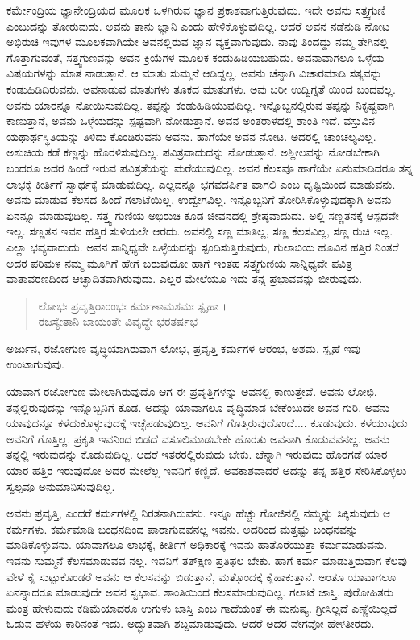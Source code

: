 ಕರ್ಮೇಂದ್ರಿಯ ಜ್ಞಾನೇಂದ್ರಿಯದ ಮೂಲಕ ಒಳಗಿರುವ ಜ್ಞಾನ ಪ್ರಕಾಶವಾಗುತ್ತಿರುವುದು. ಇದೇ ಅವನು ಸತ್ತ್ವಗುಣಿ ಎಂಬುದನ್ನು ತೋರುವುದು. ಅವನು ತಾನು ಜ್ಞಾನಿ ಎಂದು ಹೇಳಿಕೊಳ್ಳುವುದಿಲ್ಲ. ಆದರೆ ಅವನ ನಡೆನುಡಿ ನೋಟ ಅಭಿರುಚಿ ಇವುಗಳ ಮೂಲಕವಾಗಿಯೇ ಅವನಲ್ಲಿರುವ ಜ್ಞಾನ ವ್ಯಕ್ತವಾಗುವುದು. ನಾವು ತಿಂದದ್ದು ನಮ್ಮ ತೇಗಿನಲ್ಲಿ ಗೊತ್ತಾಗುವಂತೆ, ಸತ್ತ್ವಗುಣವನ್ನು ಅವನ ಕ್ರಿಯೆಗಳ ಮೂಲಕ ಕಂಡುಹಿಡಿಯಬಹುದು. ಅವನಾವಾಗಲೂ ಒಳ್ಳೆಯ ವಿಷಯಗಳನ್ನು ಮಾತ ನಾಡುತ್ತಾನೆ. ಆ ಮಾತು ಸುಮ್ಮನೆ ಆಡಿದ್ದಲ್ಲ. ಅವನು ಚೆನ್ನಾಗಿ ವಿಚಾರಮಾಡಿ ಸತ್ಯವನ್ನು ಕಂಡುಹಿಡಿದಿರುವನು. ಅವನಾಡುವ ಮಾತುಗಳು ತೂಕದ ಮಾತುಗಳು. ಅವು ಬರೀ ಉದ್ವಿಗ್ನತೆ ಯಿಂದ ಬಂದವಲ್ಲ. ಅವನು ಯಾರನ್ನೂ ನೋಯಿಸುವುದಿಲ್ಲ. ತಪ್ಪನ್ನು ಕಂಡುಹಿಡಿಯುವುದಿಲ್ಲ. ಇನ್ನೊಬ್ಬನಲ್ಲಿರುವ ತಪ್ಪನ್ನು ನಿಕೃಷ್ಚವಾಗಿ ಕಾಣುತ್ತಾನೆ, ಅವನು ಒಳ್ಳೆಯದನ್ನು ಸ್ಪಷ್ಟವಾಗಿ ನೋಡುತ್ತಾನೆ. ಅವನ ಅಂತರಾಳದಲ್ಲಿ ಶಾಂತಿ ಇದೆ. ವಸ್ತುವಿನ ಯಥಾರ್ಥಸ್ಥಿತಿಯನ್ನು ತಿಳಿದು ಕೊಂಡಿರುವನು ಅವನು. ಹಾಗೆಯೇ ಅವನ ನೋಟ. ಅದರಲ್ಲಿ ಚಾಂಚಲ್ಯವಿಲ್ಲ. ಅಶುಚಿಯ ಕಡೆ ಕಣ್ಣನ್ನು ಹೊರಳಿಸುವುದಿಲ್ಲ. ಪವಿತ್ರವಾದುದನ್ನು ನೋಡುತ್ತಾನೆ. ಅಶ್ಲೀಲವನ್ನು ನೋಡಬೇಕಾಗಿ ಬಂದರೂ ಅದರ ಹಿಂದೆ ಇರುವ ಪವಿತ್ರತೆಯನ್ನು ಮರೆಯುವುದಿಲ್ಲ. ಅವನ ಕೆಲಸವೂ ಹಾಗೆಯೇ ಏನುಮಾಡಿದರೂ ತನ್ನ ಲಾಭಕ್ಕೆ ಕೀರ್ತಿಗೆ ಸ್ವಾರ್ಥಕ್ಕೆ ಮಾಡುವುದಿಲ್ಲ. ಎಲ್ಲವನ್ನೂ ಭಗವದರ್ಪಿತ ವಾಗಲಿ ಎಂಬ ದೃಷ್ಟಿಯಿಂದ ಮಾಡುವನು. ಅವನು ಮಾಡುವ ಕೆಲಸದ ಹಿಂದೆ ಗಲಾಟೆಯಿಲ್ಲ, ಉದ್ವೇಗವಿಲ್ಲ. ಇನ್ನೊಬ್ಬನಿಗೆ ತೋರಿಸಿಕೊಳ್ಳುವುದಕ್ಕಾಗಿ ಅವನು ಏನನ್ನೂ ಮಾಡುವುದಿಲ್ಲ. ಸತ್ತ್ವ ಗುಣಿಯ ಅಭಿರುಚಿ ಕೂಡ ಜೀವನದಲ್ಲಿ ಶ್ರೇಷ್ಠವಾದುದು. ಅಲ್ಲಿ ಸಣ್ಣತನಕ್ಕೆ ಆಸ್ಪದವೇ ಇಲ್ಲ. ಸಣ್ಣತನ ಇವನ ಹತ್ತಿರ ಸುಳಿಯಲೇ ಆರದು. ಅವನಲ್ಲಿ ಸಣ್ಣ ಮಾತಿಲ್ಲ, ಸಣ್ಣ ಕೆಲಸವಿಲ್ಲ, ಸಣ್ಣ ರುಚಿ ಇಲ್ಲ. ಎಲ್ಲಾ ಭವ್ಯವಾದುದು. ಅವನ ಸಾನ್ನಿಧ್ಯವೇ ಒಳ್ಳೆಯದನ್ನು ಸ್ಪಂದಿಸುತ್ತಿರುವುದು, ಗುಲಾಬಿಯ ಹೂವಿನ ಹತ್ತಿರ ನಿಂತರೆ ಅದರ ಪರಿಮಳ ನಮ್ಮ ಮೂಗಿಗೆ ಹೇಗೆ ಬರುವುದೋ ಹಾಗೆ ಇಂತಹ ಸತ್ತ್ವಗುಣಿಯ ಸಾನ್ನಿಧ್ಯವೇ ಪವಿತ್ರ ವಾತಾವರಣದಿಂದ ಆಚ್ಛಾದಿತವಾಗಿರುವುದು. ಎಲ್ಲರ ಮೇಲೆಯೂ ಇದು ತನ್ನ ಪ್ರಭಾವವನ್ನು ಬೀರುವುದು.

\begin{verse}
ಲೋಭಃ ಪ್ರವೃತ್ತಿರಾರಂಭಃ ಕರ್ಮಣಾಮಶಮಃ ಸ್ಪೃಹಾ ।\\ರಜಸ್ಯೇತಾನಿ ಜಾಯಂತೇ ವಿವೃದ್ಧೇ ಭರತರ್ಷಭ 
\end{verse}

{\small ಅರ್ಜುನ, ರಜೋಗುಣ ವೃದ್ಧಿಯಾಗಿರುವಾಗ ಲೋಭ, ಪ್ರವೃತ್ತಿ ಕರ್ಮಗಳ ಆರಂಭ, ಅಶಮ, ಸ್ಪೃಹೆ ಇವು ಉಂಟಾಗುವುವು.}

ಯಾವಾಗ ರಜೋಗುಣ ಮೇಲಾಗಿರುವುದೊ ಆಗ ಈ ಪ್ರವೃತ್ತಿಗಳನ್ನು ಅವನಲ್ಲಿ ಕಾಣುತ್ತೇವೆ. ಅವನು ಲೋಭಿ. ತನ್ನಲ್ಲಿರುವುದನ್ನು ಇನ್ನೊಬ್ಬನಿಗೆ ಕೊಡ. ಅದನ್ನು ಯಾವಾಗಲೂ ವೃದ್ಧಿಮಾಡ ಬೇಕೆಂಬುದೇ ಅವನ ಗುರಿ. ಅವನು ಯಾವುದನ್ನೂ ಕಳೆದುಕೊಳ್ಳುವುದಕ್ಕೆ ಇಚ್ಛೆಪಡುವುದಿಲ್ಲ. ಅವನಿಗೆ ಗೊತ್ತಿರುವುದೊಂದೆ.... ಕೂಡುವುದು. ಕಳೆಯುವುದು ಅವನಿಗೆ ಗೊತ್ತಿಲ್ಲ. ಪ್ರಕೃತಿ ಇವನಿಂದ ಬಿಡದೆ ವಸೂಲಿಮಾಡಬೇಕೇ ಹೊರತು ಅವನಾಗಿ ಕೊಡುವವನಲ್ಲ. ಅವನು ತನ್ನಲ್ಲಿ ಇರುವುದನ್ನು ಕೊಡುವುದಿಲ್ಲ. ಆದರೆ ಇತರರಲ್ಲಿರುವುದು ಬೇಕು. ಚೆನ್ನಾಗಿ ಇರುವುದು ಹೊರಗಡೆ ಯಾರ ಯಾರ ಹತ್ತಿರ ಇರುವುದೋ ಅದರ ಮೇಲೆಲ್ಲ ಇವನಿಗೆ ಕಣ್ಣಿದೆ. ಅವಕಾಶವಾದರೆ ಅದನ್ನು ತನ್ನ ಹತ್ತಿರ ಸೇರಿಸಿಕೊಳ್ಳಲು ಸ್ವಲ್ಪವೂ ಅನುಮಾನಿಸುವುದಿಲ್ಲ.

ಅವನು ಪ್ರವೃತ್ತಿ, ಎಂದರೆ ಕರ್ಮಗಳಲ್ಲಿ ನಿರತನಾಗಿರುವನು. ಇನ್ನೂ ಹೆಚ್ಚು ಗೋಜಿನಲ್ಲಿ ನಮ್ಮನ್ನು ಸಿಕ್ಕಿಸುವುದು ಆ ಕರ್ಮಗಳು. ಕರ್ಮಮಾಡಿ ಬಂಧನದಿಂದ ಪಾರಾಗುವವನಲ್ಲ ಇವನು. ಅದರಿಂದ ಮತ್ತಷ್ಟು ಬಂಧನವನ್ನು ಮಾಡಿಕೊಳ್ಳುವನು. ಯಾವಾಗಲೂ ಲಾಭಕ್ಕೆ, ಕೀರ್ತಿಗೆ ಅಧಿಕಾರಕ್ಕೆ ಇವನು ಹಾತೊರೆಯುತ್ತಾ ಕರ್ಮಮಾಡುವನು. ಇವನು ಸುಮ್ಮನೆ ಕೆಲಸಮಾಡುವವ ನಲ್ಲ. ಇವನಿಗೆ ತತ್​ಕ್ಷಣ ಪ್ರತಿಫಲ ಬೇಕು. ಹಾಗೆ ಕರ್ಮ ಮಾಡುತ್ತಿರುವಾಗ ಕೆಲವು ವೇಳೆ ಕೈ ಸುಟ್ಟುಕೊಂಡರೆ ಅವನು ಆ ಕೆಲಸವನ್ನು ಬಿಡುತ್ತಾನೆ, ಮತ್ತೊಂದಕ್ಕೆ ಕೈಹಾಕುತ್ತಾನೆ. ಅಂತೂ ಯಾವಾಗಲೂ ಏನನ್ನಾದರೂ ಮಾಡುವುದೇ ಅವನ ಸ್ವಭಾವ. ಶಾಂತಿಯಿಂದ ಕೆಲಸಮಾಡುವುದಿಲ್ಲ. ಗಲಾಟೆ ಜಾಸ್ತಿ. ಪುರೋಹಿತರು ಮಂತ್ರ ಹೇಳುವುದು ಕಡಿಮೆಯಾದರೂ ಉಗುಳು ಜಾಸ್ತಿ ಎಂಬ ಗಾದೆಯಂತೆ ಈ ಮನುಷ್ಯ. ಗ್ರೀಸಿಲ್ಲದೆ ಎಣ್ಣೆಯಿಲ್ಲದೆ ಓಡುವ ಹಳೆಯ ಕಾರಿನಂತೆ ಇದು. ಅದ್ಭುತವಾಗಿ ಶಬ್ದಮಾಡುವುದು. ಆದರೆ ಅದರ ವೇಗವೋ ಹೇಳತೀರದು.

